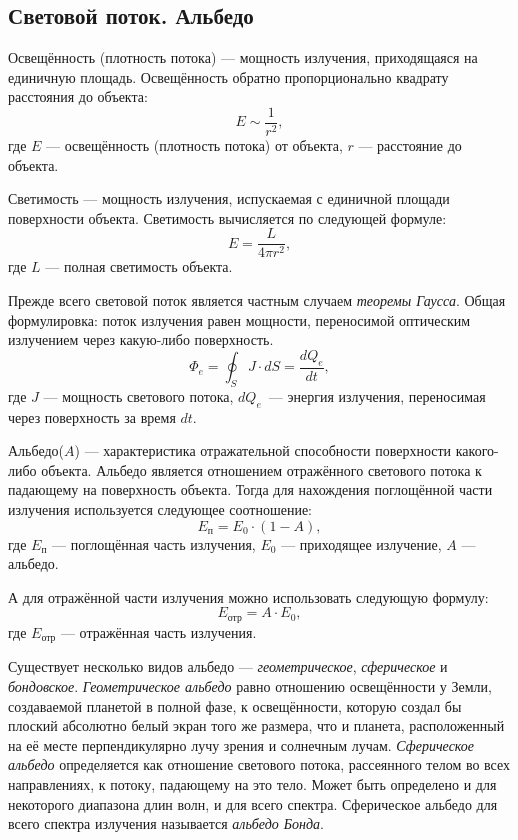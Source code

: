 \subsection{Световой поток. Альбедо}
Освещённость (плотность потока) --- мощность излучения, приходящаяся на единичную площадь. Освещённость обратно пропорционально квадрату расстояния до объекта:
\begin{equation}
E\sim \frac{1}{r^2},
\end{equation}
где $E$ --- освещённость (плотность потока) от объекта, $r$ --- расстояние до объекта.

Светимость --- мощность излучения, испускаемая с единичной площади поверхности объекта. Светимость вычисляется по следующей формуле:
\begin{equation}
E=\frac{L}{4\pi r^2},
\end{equation}
где $L$ --- полная светимость объекта.

Прежде всего световой поток является частным случаем \textit{теоремы Гаусса}. Общая формулировка:  поток излучения равен мощности, переносимой оптическим излучением через какую-либо поверхность. 
\begin{equation}
\Phi_e=\oint_SJ\cdot dS=\frac{dQ_e}{dt},
\end{equation}
где $J$ --- мощность светового потока, $dQ_e$~--- энергия излучения, переносимая через поверхность за время $dt$.


Альбедо($A$) --- характеристика отражательной способности поверхности какого-либо объекта. Альбедо является отношением отражённого светового потока к падающему на поверхность объекта. Тогда для нахождения поглощённой части излучения используется следующее соотношение:
\begin{equation}
E_{\text{п}}=E_0\cdot (1-A),
\end{equation}
где $E_{\text{п}}$ --- поглощённая часть излучения, $E_0$ --- приходящее излучение, $A$ --- альбедо.

А для отражённой части излучения можно использовать следующую формулу:
\begin{equation}
E_{\text{отр}}=A\cdot E_0,
\end{equation}
где $E_{\text{отр}}$ --- отражённая часть излучения.

Существует несколько видов альбедо --- \textit{геометрическое}, \textit{сферическое} и \textit{бондовское}. \textit{Геометрическое альбедо} равно отношению освещённости у Земли, создаваемой планетой в полной фазе, к освещённости, которую создал бы плоский абсолютно белый экран того же размера, что и планета, расположенный на её месте перпендикулярно лучу зрения и солнечным лучам. \textit{Сферическое альбедо} определяется как отношение светового потока, рассеянного телом во всех направлениях, к потоку, падающему на это тело. Может быть определено и для некоторого диапазона длин волн, и для всего спектра. Сферическое альбедо для всего спектра излучения называется \textit{альбедо Бонда}.